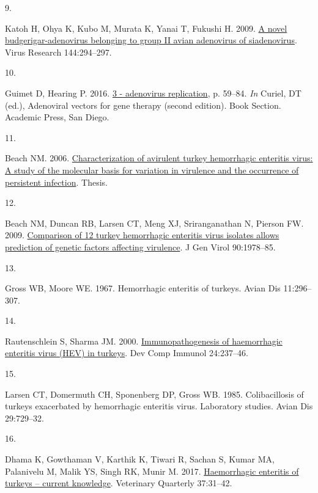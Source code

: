 \documentclass[
]{article}
\newlength{\cslhangindent}
\newlength{\csllabelwidth}
\newenvironment{CSLReferences}[2] %
 {\begin{list}{}{%
  \setlength{\itemindent}{0pt}
  \setlength{\leftmargin}{0pt}
  \setlength{\parsep}{0pt}
  \ifodd #1
   \setlength{\leftmargin}{\cslhangindent}
   \setlength{\itemindent}{-1\cslhangindent}
  \fi
  \setlength{\itemsep}{#2\baselineskip}}}
 {\end{list}}
\newcommand{\CSLLeftMargin}[1]{\parbox[t]{\csllabelwidth}{\strut#1\strut}}
\newcommand{\CSLRightInline}[1]{\parbox[t]{\linewidth - \csllabelwidth}{\strut#1\strut}}
\begin{document}
\begin{CSLReferences}{0}{1}
\CSLLeftMargin{9. }%
\CSLRightInline{Katoh H, Ohya K, Kubo M, Murata K, Yanai T, Fukushi H.
2009. \href{https://doi.org/10.1016/j.virusres.2009.04.012}{A novel
budgerigar-adenovirus belonging to group II avian adenovirus of
siadenovirus}. Virus Research 144:294--297.}

\CSLLeftMargin{10. }%
\CSLRightInline{Guimet D, Hearing P. 2016.
\href{https://doi.org/10.1016/B978-0-12-800276-6.00003-6}{3 - adenovirus
replication}, p. 59--84. \emph{In} Curiel, DT (ed.), Adenoviral vectors
for gene therapy (second edition). Book Section. Academic Press, San
Diego.}

\CSLLeftMargin{11. }%
\CSLRightInline{Beach NM. 2006.
\href{http://scholar.lib.vt.edu/theses/available/etd-08142006-145339/}{Characterization
of avirulent turkey hemorrhagic enteritis virus: A study of the
molecular basis for variation in virulence and the occurrence of
persistent infection}. Thesis.}

\CSLLeftMargin{12. }%
\CSLRightInline{Beach NM, Duncan RB, Larsen CT, Meng XJ, Sriranganathan
N, Pierson FW. 2009.
\href{https://doi.org/10.1099/vir.0.010090-0}{Comparison of 12 turkey
hemorrhagic enteritis virus isolates allows prediction of genetic
factors affecting virulence}. J Gen Virol 90:1978--85.}

\CSLLeftMargin{13. }%
\CSLRightInline{Gross WB, Moore WE. 1967. Hemorrhagic enteritis of
turkeys. Avian Dis 11:296--307.}

\CSLLeftMargin{14. }%
\CSLRightInline{Rautenschlein S, Sharma JM. 2000.
\href{https://doi.org/10.1016/s0145-305x(99)00075-0}{Immunopathogenesis
of haemorrhagic enteritis virus (HEV) in turkeys}. Dev Comp Immunol
24:237--46.}

\CSLLeftMargin{15. }%
\CSLRightInline{Larsen CT, Domermuth CH, Sponenberg DP, Gross WB. 1985.
Colibacillosis of turkeys exacerbated by hemorrhagic enteritis virus.
Laboratory studies. Avian Dis 29:729--32.}

\CSLLeftMargin{16. }%
\CSLRightInline{Dhama K, Gowthaman V, Karthik K, Tiwari R, Sachan S,
Kumar MA, Palanivelu M, Malik YS, Singh RK, Munir M. 2017.
\href{https://doi.org/10.1080/01652176.2016.1277281}{Haemorrhagic
enteritis of turkeys -- current knowledge}. Veterinary Quarterly
37:31--42.}


\end{CSLReferences}
\end{document}
